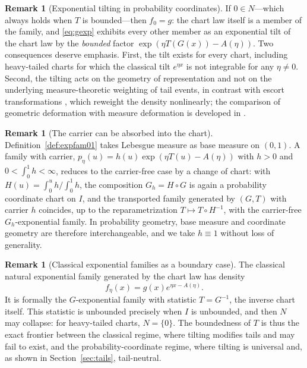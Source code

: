 \documentclass[11pt]{article}
\theoremstyle{definition}
\newtheorem{remark}[theorem]{Remark}
\begin{document}
\begin{remark}[Exponential tilting in probability coordinates]
\label{rem:tilting}
If $0\in N$---which always holds when $T$ is bounded---then $f_0=g$: the
chart law itself is a member of the family, and \eqref{eq:gexp} exhibits
every other member as an exponential tilt of the chart law by the
\emph{bounded} factor $\exp(\eta T(G(x))-A(\eta))$. Two consequences
deserve emphasis. First, the tilt exists for every chart, including
heavy-tailed charts for which the classical tilt $e^{\eta x}$ is not
integrable for any $\eta\neq0$. Second, the tilting acts on the geometry
of representation and not on the underlying measure-theoretic weighting of
tail events, in contrast with escort transformations
\cite{Tsallis1988}, which reweight the density nonlinearly; the comparison
of geometric deformation with measure deformation is developed in
\cite{Cojocea2026a}.
\end{remark}

\begin{remark}[The carrier can be absorbed into the chart]
\label{rem:carrier}
Definition~\ref{def:expfam01} takes Lebesgue measure as base measure on
$(0,1)$. A family with carrier, $p_\eta(u)=h(u)\exp(\eta T(u)-A(\eta))$
with $h>0$ and $0<\int_0^1 h<\infty$, reduces to the carrier-free case by
a change of chart: with $H(u)=\int_0^u h/\int_0^1 h$, the composition
$G_h=H\circ G$ is again a probability coordinate chart on $I$, and the
transported family generated by $(G,T)$ with carrier $h$ coincides, up to
the reparametrization $T\mapsto T\circ H^{-1}$, with the carrier-free
$G_h$-exponential family. In probability geometry, base measure and
coordinate geometry are therefore interchangeable, and we take $h\equiv1$
without loss of generality.
\end{remark}

\begin{remark}[Classical exponential families as a boundary case]
\label{rem:classical}
The classical natural exponential family generated by the chart law has
density
\[
f_\eta(x)=g(x)e^{\eta x-A(\eta)}.
\]
It is formally the $G$-exponential family with statistic $T=G^{-1}$, the
inverse chart itself. This statistic is
unbounded precisely when $I$ is unbounded, and then $N$ may collapse: for
heavy-tailed charts, $N=\{0\}$. The boundedness of $T$ is thus the exact
frontier between the classical regime, where tilting modifies tails and
may fail to exist, and the probability-coordinate regime, where tilting is
universal and, as shown in Section~\ref{sec:tails}, tail-neutral.
\end{remark}
\end{document}
